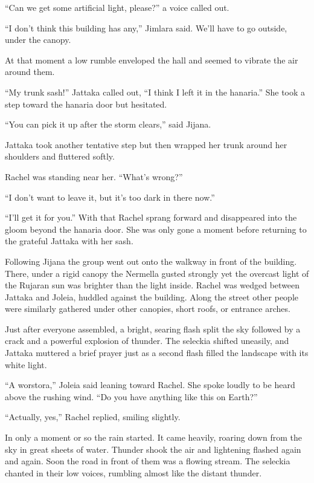 ``Can we get some artificial light, please?'' a voice called out.

``I don't think this building has any,'' Jimlara said. We'll have to go outside, under the
canopy.

At that moment a low rumble enveloped the hall and seemed to vibrate the air around them.

``My trunk sash!'' Jattaka called out, ``I think I left it in the hanaria.'' She took a step
toward the hanaria door but hesitated.

``You can pick it up after the storm clears,'' said Jijana.

Jattaka took another tentative step but then wrapped her trunk around her shoulders and
fluttered softly.

Rachel was standing near her. ``What's wrong?''

``I don't want to leave it, but it's too dark in there now.''

``I'll get it for you.'' With that Rachel sprang forward and disappeared into the gloom beyond
the hanaria door. She was only gone a moment before returning to the grateful Jattaka with her
sash.

Following Jijana the group went out onto the walkway in front of the building. There, under a
rigid canopy the Nermella gusted strongly yet the overcast light of the Rujaran sun was brighter
than the light inside. Rachel was wedged between Jattaka and Joleia, huddled against the
building. Along the street other people were similarly gathered under other canopies, short
roofs, or entrance arches.

Just after everyone assembled, a bright, searing flash split the sky followed by a crack and a
powerful explosion of thunder. The seleckia shifted uneasily, and Jattaka muttered a brief
prayer just as a second flash filled the landscape with its white light.

``A worstora,'' Joleia said leaning toward Rachel. She spoke loudly to be heard above the
rushing wind. ``Do you have anything like this on Earth?''

``Actually, yes,'' Rachel replied, smiling slightly.

In only a moment or so the rain started. It came heavily, roaring down from the sky in great
sheets of water. Thunder shook the air and lightening flashed again and again. Soon the road in
front of them was a flowing stream. The seleckia chanted in their low voices, rumbling almost
like the distant thunder.

